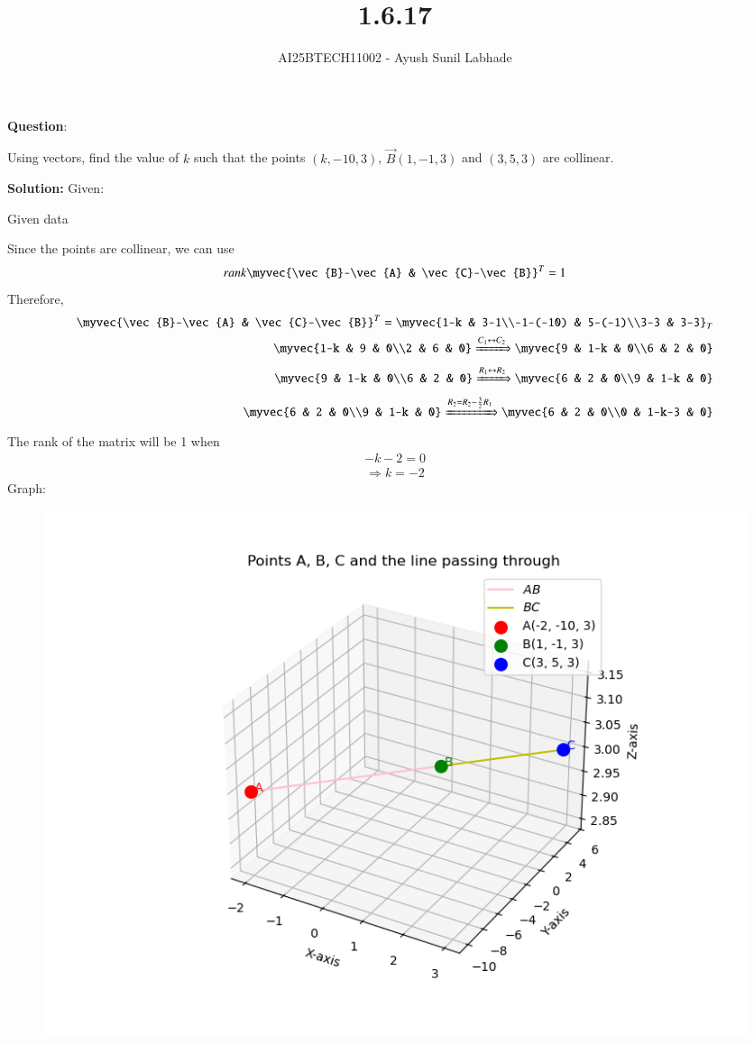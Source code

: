 \documentclass[journal,12pt,onecolumn]{IEEEtran}
\begin{document}
\title{1.6.17}
\author{AI25BTECH11002 - Ayush Sunil Labhade}
{\let\newpage\relax\maketitle}
		\textbf{Question}:\newline

		Using vectors, find the value of $k$ such that the points $(k , -10, 3)$, $\vec{B}(1, -1, 3)$ and $(3, 5, 3)$ are collinear.

		\textbf{Solution:}
		Given:
		\begin{table}[H]
			\centering
			
			\label{}
			\caption{Given data}
		\end{table}
		Since the points are collinear, we can use 
		\begin{align}
			rank\myvec{\vec{B}-\vec{A} & \vec{C}-\vec{B}}^T = 1	
		\end{align}
		Therefore,
		\begin{align}
			\myvec{\vec{B}-\vec{A} & \vec{C}-\vec{B}}^T = \myvec{1-k & 3-1\\-1-(-10) & 5-(-1)\\3-3 & 3-3}_T	
	         	\\
			\myvec{1-k & 9 & 0\\2 & 6 & 0}
			\xRightarrow[]{C_1 \leftrightarrow C_2} 
			\myvec{9 & 1-k & 0\\6 & 2 & 0} 
			\\
			\myvec{9 & 1-k & 0\\6 & 2 & 0}
			\xRightarrow[]{R_1 \leftrightarrow R_2} 
			\myvec{6 & 2 & 0\\9 & 1-k & 0} 
			\\
			\myvec{6 & 2 & 0\\9 & 1-k & 0}
			\xRightarrow[]{R_2= R_2-\frac{3}{2}R_1} 
			\myvec{6 & 2 & 0\\0 & 1-k-3 & 0} 
		\end{align}
		The rank of the matrix will be 1 when 
		\begin{align}
		-k-2 = 0
		\end{align}
		\begin{align}
		\Rightarrow k = -2
		\end{align}
		\newpage
		Graph:
\begin{figure}[H]
	\centering
	\includegraphics[scale=0.5]{plot}
	\caption*{}
	\label{fig}
\end{figure}
\end{document}
